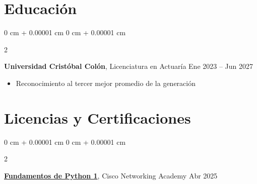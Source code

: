 \documentclass[10pt, letterpaper]{article}
\newenvironment{highlights}{
    \begin{itemize}[
        topsep=0.10 cm,
        parsep=0.10 cm,
        partopsep=0pt,
        itemsep=0pt,
        leftmargin=0 cm + 10pt
    ]
}{
    \end{itemize}
} %
\newenvironment{onecolentry}{
    \begin{adjustwidth}{
        0 cm + 0.00001 cm
    }{
        0 cm + 0.00001 cm
    }
}{
    \end{adjustwidth}
} %
\newenvironment{twocolentry}[2][]{
    \onecolentry
    \def\secondColumn{#2}
    \setcolumnwidth{\fill, 4.5 cm}
    \begin{paracol}{2}
}{
    \switchcolumn \raggedleft \secondColumn
    \end{paracol}
    \endonecolentry
} %
\begin{document}
        


    
    \section{Educación}
        
        \begin{twocolentry}{
            Ene 2023 – Jun 2027
        }
            \textbf{Universidad Cristóbal Colón}, Licenciatura en Actuaría\end{twocolentry}
                \begin{highlights}
                    \item Reconocimiento al tercer mejor promedio de la generación
                \end{highlights}    
        \vspace{0.10 cm}

 \section{Licencias y Certificaciones}

        \begin{twocolentry}{
            Abr 2025
        }
            \href{https://www.credly.com/badges/bcacb0c9-c50e-44ce-a68c-ddd050b1626e/public_url}{\textbf{Fundamentos de Python 1}}, Cisco Networking Academy \end{twocolentry}
\end{document}
